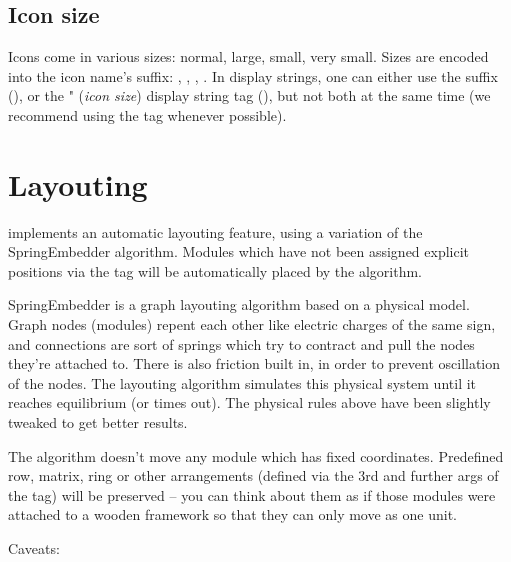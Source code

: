 \subsection{Icon size}

Icons come in various sizes: normal, large, small, very small. Sizes are
encoded into the icon name's suffix: , , , .
In display strings, one can either use the suffix (),
or the " (\textit{icon size}) display string tag (),
but not both at the same time (we recommend using the  tag whenever possible).


\section{Layouting}
\label{sec:ch-graphics:layouting}

{\opp} implements an automatic layouting feature, using
a variation of the SpringEmbedder algorithm. Modules which have
not been assigned explicit positions via the  tag will be
automatically placed by the algorithm.

SpringEmbedder is a graph layouting algorithm based on a physical model.
Graph nodes (modules) repent each other like electric charges
of the same sign, and connections are sort of springs which try
to contract and pull the nodes they're attached to. There is also friction
built in, in order to prevent oscillation of the nodes. The layouting algorithm
simulates this physical system until it reaches equilibrium
(or times out). The physical rules above have been slightly tweaked
to get better results.

The algorithm doesn't move any module which has fixed coordinates.
Predefined row, matrix, ring or other arrangements (defined
via the 3rd and further args of the  tag) will be preserved --
you can think about them as if those modules were attached
to a wooden framework so that they can only move as one unit.

Caveats:

